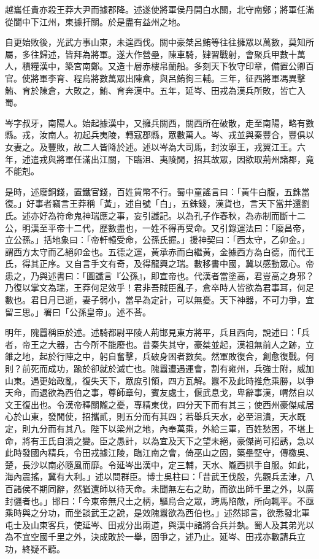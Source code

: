\begin{pinyinscope}
越巂任貴亦殺王莽大尹而據郡降。述遂使將軍侯丹開白水關，北守南鄭；將軍任滿從閬中下江州，東據扞關。於是盡有益州之地。

自更始敗後，光武方事山東，未遑西伐。關中豪桀呂鮪等往往擁眾以萬數，莫知所屬，多往歸述，皆拜為將軍。遂大作營壘，陳車騎，肄習戰射，會聚兵甲數十萬人，積糧漢中，築宮南鄭。又造十層赤樓帛蘭船。多刻天下牧守印章，備置公卿百官。使將軍李育、程烏將數萬眾出陳倉，與呂鮪徇三輔。三年，征西將軍馮異擊鮪、育於陳倉，大敗之，鮪、育奔漢中。五年，延岑、田戎為漢兵所敗，皆亡入蜀。

岑字叔牙，南陽人。始起據漢中，又擁兵關西，關西所在破散，走至南陽，略有數縣。戎，汝南人。初起兵夷陵，轉寇郡縣，眾數萬人。岑、戎並與秦豐合，豐俱以女妻之。及豐敗，故二人皆降於述。述以岑為大司馬，封汝寧王，戎翼江王。六年，述遣戎與將軍任滿出江關，下臨沮、夷陵閒，招其故眾，因欲取荊州諸郡，竟不能剋。

是時，述廢銅錢，置鐵官錢，百姓貨幣不行。蜀中童謠言曰：「黃牛白腹，五銖當復。」好事者竊言王莽稱「黃」，述自號「白」，五銖錢，漢貨也，言天下當并還劉氏。述亦好為符命鬼神瑞應之事，妄引讖記。以為孔子作春秋，為赤制而斷十二公，明漢至平帝十二代，歷數盡也，一姓不得再受命。又引錄運法曰：「廢昌帝，立公孫。」括地象曰：「帝軒轅受命，公孫氏握。」援神契曰：「西太守，乙卯金。」謂西方太守而乙絕卯金也。五德之運，黃承赤而白繼黃，金據西方為白德，而代王氏，得其正序。又自言手文有奇，及得龍興之瑞。數移書中國，冀以感動眾心。帝患之，乃與述書曰：「圖讖言『公孫』，即宣帝也。代漢者當塗高，君豈高之身邪？乃復以掌文為瑞，王莽何足效乎！君非吾賊臣亂子，倉卒時人皆欲為君事耳，何足數也。君日月已逝，妻子弱小，當早為定計，可以無憂。天下神器，不可力爭，宜留三思。」署曰「公孫皇帝」。述不荅。

明年，隗囂稱臣於述。述騎都尉平陵人荊邯見東方將平，兵且西向，說述曰：「兵者，帝王之大器，古今所不能廢也。昔秦失其守，豪桀並起，漢祖無前人之跡，立錐之地，起於行陣之中，躬自奮擊，兵破身困者數矣。然軍敗復合，創愈復戰。何則？前死而成功，踰於卻就於滅亡也。隗囂遭遇運會，割有雍州，兵強士附，威加山東。遇更始政亂，復失天下，眾庶引領，四方瓦解。囂不及此時推危乘勝，以爭天命，而退欲為西伯之事，尊師章句，賓友處士，偃武息戈，卑辭事漢，喟然自以文王復出也。令漢帝釋關隴之憂，專精東伐，四分天下而有其三；使西州豪傑咸居心於山東，發閒使，招攜貳，則五分而有其四；若舉兵天水，必至沮潰，天水既定，則九分而有其八。陛下以梁州之地，內奉萬乘，外給三軍，百姓愁困，不堪上命，將有王氏自潰之變。臣之愚計，以為宜及天下之望未絕，豪傑尚可招誘，急以此時發國內精兵，令田戎據江陵，臨江南之會，倚巫山之固，築壘堅守，傳檄吳、楚，長沙以南必隨風而靡。令延岑出漢中，定三輔，天水、隴西拱手自服。如此，海內震搖，冀有大利。」述以問群臣。博士吳柱曰：「昔武王伐殷，先觀兵孟津，八百諸侯不期同辭，然猶還師以待天命。未聞無左右之助，而欲出師千里之外，以廣封疆者也。」邯曰：「今東帝無尺土之柄，驅烏合之眾，跨馬陷敵，所向輒平。不亟乘時與之分功，而坐談武王之說，是效隗囂欲為西伯也。」述然邯言，欲悉發北軍屯士及山東客兵，使延岑、田戎分出兩道，與漢中諸將合兵并埶。蜀人及其弟光以為不宜空國千里之外，決成敗於一舉，固爭之，述乃止。延岑、田戎亦數請兵立功，終疑不聽。


\end{pinyinscope}
